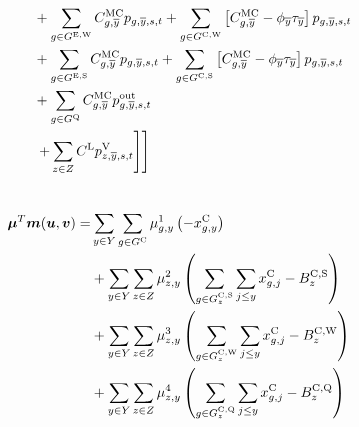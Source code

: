 \documentclass{article}
\begin{document}
\begin{alignat}{3}
	& && && + \sum\limits_{\iGenerator \in \sGeneratorsExistingWind} \cMarginalCost[\iGenerator,\iYearTerminal] \vPower[\iGenerator,\iYearTerminal,\iScenario,\iInterval] + \sum\limits_{\iGenerator \in \sGeneratorsCandidateWind} \left[\cMarginalCost[\iGenerator,\iYearTerminal] - \vBaseline[\iYearTerminal] \vPermitPrice[\iYearTerminal]\right] \vPower[\iGenerator,\iYearTerminal,\iScenario,\iInterval] \nonumber\\
	& && && + \sum\limits_{\iGenerator \in \sGeneratorsExistingSolar} \cMarginalCost[\iGenerator,\iYearTerminal] \vPower[\iGenerator,\iYearTerminal,\iScenario,\iInterval] + \sum\limits_{\iGenerator \in \sGeneratorsCandidateSolar} \left[\cMarginalCost[\iGenerator,\iYearTerminal] - \vBaseline[\iYearTerminal]\vPermitPrice[\iYearTerminal]\right] \vPower[\iGenerator,\iYearTerminal,\iScenario,\iInterval]\nonumber\\
	& && && + \sum\limits_{\iGenerator \in \sStorage} \cMarginalCost[\iGenerator,\iYearTerminal] \vPowerOut[\iGenerator,\iYearTerminal,\iScenario,\iInterval] \nonumber\\
	& && && \left.\left. + \sum\limits_{\iZone \in \sZones} \cLostLoadCost \vLostLoadPower[\iZone,\iYearTerminal,\iScenario,\iInterval] \right]\right] \\\nonumber
\end{alignat}

\begin{align}
\bm{\mu}^{T}\bm{m}(\bm{u}, \bm{v}) = & \sum\limits_{\iYear \in \sYears} \sum\limits_{\iGenerator \in \sGeneratorsCandidate} \dNonNegativeCandidateCapacity \left(-\vInstalledCapacity\right)\nonumber\\
& + \sum\limits_{\iYear \in \sYears}\sum\limits_{\iZone \in \sZones} \dSolarBuildLimit \left(\sum\limits_{\iGenerator \in \sGeneratorsCandidateSolar_{\iZone}} \sum\limits_{\iYearAlias \leq \iYear} \vInstalledCapacity[\iGenerator,\iYearAlias]  - \cBuildLimitSolar\right)\nonumber\\
& + \sum\limits_{\iYear \in \sYears}\sum\limits_{\iZone \in \sZones} \dWindBuildLimit \left(\sum\limits_{\iGenerator \in \sGeneratorsCandidateWind_{\iZone}} \sum\limits_{\iYearAlias \leq \iYear} \vInstalledCapacity[\iGenerator,\iYearAlias] - \cBuildLimitWind\right)\nonumber\\
& + \sum\limits_{\iYear \in \sYears}\sum\limits_{\iZone \in \sZones} \dStorageBuildLimit \left(\sum\limits_{\iGenerator \in \sStorageCandidate_{\iZone}} \sum\limits_{\iYearAlias \leq \iYear} \vInstalledCapacity[\iGenerator,\iYearAlias] - \cBuildLimitStorage\right)\\\nonumber
\end{align}
\end{document}
